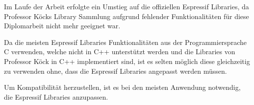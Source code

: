 Im Laufe der Arbeit erfolgte ein Umstieg auf die offiziellen Espressif Libraries, da Professor Köcks Library Sammlung aufgrund fehlender Funktionalitäten für diese Diplomarbeit nicht mehr geeignet war.

Da die meisten Espressif Libraries Funktionalitäten aus der Programmiersprache C verwenden, welche nicht in C++ unterstützt werden und die Libraries von Professor Köck in C++ implementiert sind, ist es selten möglich diese gleichzeitig zu verwenden ohne, dass die Espressif Libraries angepasst werden müssen.

Um Kompatibilität herzustellen, ist es bei den meisten Anwendung notwendig, die Espressif Libraries anzupassen.